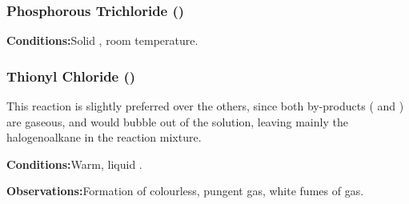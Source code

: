 

			\subsubsection{Phosphorous Trichloride ()}

				\vspace{1.5em}
				\vbox{\textbf{Conditions:}\tabto{35mm}Solid , room temperature.}


			\subsubsection{Thionyl Chloride ()}

				This reaction is slightly preferred over the others, since both by-products ( and ) are
				gaseous, and would bubble out of the solution, leaving mainly the halogenoalkane in the reaction mixture.

				\vspace{1.5em}
				\vbox{\textbf{Conditions:}\tabto{35mm}Warm, liquid .}

				\vspace{0.75em}
				\vbox{\textbf{Observations:}\tabto{35mm}Formation of colourless, pungent  gas,
											\tabto{35mm}white fumes of  gas.}

